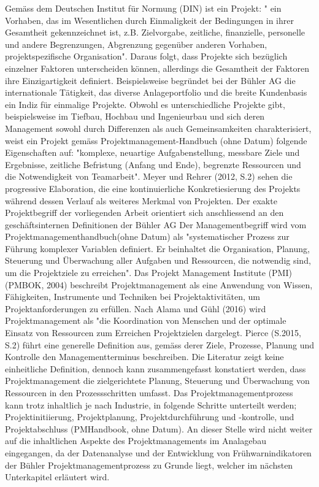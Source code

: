 \documentclass[11pt]{article}
\begin{document}
Gemäss dem Deutschen Institut für Normung (DIN) ist ein Projekt: " ein Vorhaben, das im Wesentlichen durch Einmaligkeit der Bedingungen in ihrer Gesamtheit gekennzeichnet ist, z.B. Zielvorgabe, zeitliche, finanzielle, personelle und andere Begrenzungen, Abgrenzung gegenüber anderen Vorhaben, projektspezifische Organisation". Daraus folgt, dass Projekte sich bezüglich einzelner Faktoren unterscheiden können, allerdings die Gesamtheit der Faktoren ihre Einzigartigkeit definiert. Beispielsweise begründet bei der Bühler AG die internationale Tätigkeit, das diverse Anlageportfolio und die breite Kundenbasis ein Indiz für einmalige Projekte. Obwohl es unterschiedliche Projekte gibt, beispielsweise im Tiefbau, Hochbau und Ingenieurbau und sich deren Management sowohl durch Differenzen als auch Gemeinsamkeiten charakterisiert, weist ein Projekt gemäss Projektmanagement-Handbuch (ohne Datum) folgende Eigenschaften auf: "komplexe, neuartige Aufgabenstellung, messbare Ziele und Ergebnisse, zeitliche Befristung (Anfang und Ende), begrenzte Ressourcen und die Notwendigkeit von Teamarbeit". Meyer und Rehrer (2012, S.2) sehen die progressive Elaboration, die eine kontinuierliche Konkretiesierung des Projekts während dessen Verlauf als weiteres Merkmal von Projekten. Der exakte Projektbegriff der vorliegenden Arbeit orientiert sich anschliessend an den geschäftsinternen Definitionen der Bühler AG
\newline
Der Managementbegriff wird vom Projektmanagementhandbuch(ohne Datum) als "systematischer Prozess zur Führung komplexer Variablen definiert. Er beinhaltet die Organisation, Planung, Steuerung und Überwachung aller Aufgaben und Ressourcen, die notwendig sind, um die Projektziele zu erreichen". Das Projekt Management Institute (PMI) (PMBOK, 2004) beschreibt Projektmanagement als eine Anwendung von Wissen, Fähigkeiten, Instrumente und Techniken bei Projektaktivitäten, um Projektanforderungen zu erfüllen. Nach Alama und Gühl (2016) wird Projektmanagement als "die Koordination von Menschen und der optimale Einsatz von Ressourcen zum Erreichen Projektzielen dargelegt. Pierce (S.2015, S.2) führt eine generelle Definition aus, gemäss derer Ziele, Prozesse, Planung und Kontrolle den Managementterminus beschreiben. Die Literatur zeigt keine einheitliche Definition, dennoch kann zusammengefasst konstatiert werden, dass Projektmanagement die zielgerichtete Planung, Steuerung und Überwachung von  Ressourcen in den Prozessschritten umfasst. Das Projektmanagementprozess kann trotz inhaltlich je nach Industrie, in folgende Schritte unterteilt werden; Projektinitiierung, Projektplanung, Projektdurchführung und -kontrolle, und Projektabschluss (PMHandbook, ohne Datum). An dieser Stelle wird nicht weiter auf die inhaltlichen Aspekte des Projektmanagements im Analagebau eingegangen, da der Datenanalyse und der Entwicklung von Frühwarnindikatoren der Bühler Projektmanagementprozess zu Grunde liegt, welcher im nächsten Unterkapitel erläutert wird.
\end{document}
